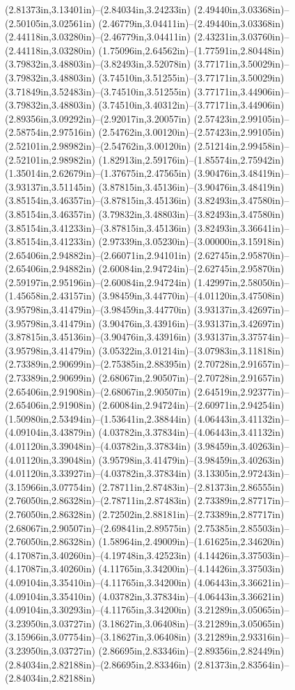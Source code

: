 (2.81373in,3.13401in)--(2.84034in,3.24233in) (2.49440in,3.03368in)--(2.50105in,3.02561in) (2.46779in,3.04411in)--(2.49440in,3.03368in) (2.44118in,3.03280in)--(2.46779in,3.04411in) (2.43231in,3.03760in)--(2.44118in,3.03280in) (1.75096in,2.64562in)--(1.77591in,2.80448in) (3.79832in,3.48803in)--(3.82493in,3.52078in) (3.77171in,3.50029in)--(3.79832in,3.48803in) (3.74510in,3.51255in)--(3.77171in,3.50029in) (3.71849in,3.52483in)--(3.74510in,3.51255in) (3.77171in,3.44906in)--(3.79832in,3.48803in) (3.74510in,3.40312in)--(3.77171in,3.44906in) (2.89356in,3.09292in)--(2.92017in,3.20057in) (2.57423in,2.99105in)--(2.58754in,2.97516in) (2.54762in,3.00120in)--(2.57423in,2.99105in) (2.52101in,2.98982in)--(2.54762in,3.00120in) (2.51214in,2.99458in)--(2.52101in,2.98982in) (1.82913in,2.59176in)--(1.85574in,2.75942in) (1.35014in,2.62679in)--(1.37675in,2.47565in) (3.90476in,3.48419in)--(3.93137in,3.51145in) (3.87815in,3.45136in)--(3.90476in,3.48419in) (3.85154in,3.46357in)--(3.87815in,3.45136in) (3.82493in,3.47580in)--(3.85154in,3.46357in) (3.79832in,3.48803in)--(3.82493in,3.47580in) (3.85154in,3.41233in)--(3.87815in,3.45136in) (3.82493in,3.36641in)--(3.85154in,3.41233in) (2.97339in,3.05230in)--(3.00000in,3.15918in) (2.65406in,2.94882in)--(2.66071in,2.94101in) (2.62745in,2.95870in)--(2.65406in,2.94882in) (2.60084in,2.94724in)--(2.62745in,2.95870in) (2.59197in,2.95196in)--(2.60084in,2.94724in) (1.42997in,2.58050in)--(1.45658in,2.43157in) (3.98459in,3.44770in)--(4.01120in,3.47508in) (3.95798in,3.41479in)--(3.98459in,3.44770in) (3.93137in,3.42697in)--(3.95798in,3.41479in) (3.90476in,3.43916in)--(3.93137in,3.42697in) (3.87815in,3.45136in)--(3.90476in,3.43916in) (3.93137in,3.37574in)--(3.95798in,3.41479in) (3.05322in,3.01214in)--(3.07983in,3.11818in) (2.73389in,2.90699in)--(2.75385in,2.88395in) (2.70728in,2.91657in)--(2.73389in,2.90699in) (2.68067in,2.90507in)--(2.70728in,2.91657in) (2.65406in,2.91908in)--(2.68067in,2.90507in) (2.64519in,2.92377in)--(2.65406in,2.91908in) (2.60084in,2.94724in)--(2.60971in,2.94254in) (1.50980in,2.53494in)--(1.53641in,2.38844in) (4.06443in,3.41132in)--(4.09104in,3.43879in) (4.03782in,3.37834in)--(4.06443in,3.41132in) (4.01120in,3.39048in)--(4.03782in,3.37834in) (3.98459in,3.40263in)--(4.01120in,3.39048in) (3.95798in,3.41479in)--(3.98459in,3.40263in) (4.01120in,3.33927in)--(4.03782in,3.37834in) (3.13305in,2.97243in)--(3.15966in,3.07754in) (2.78711in,2.87483in)--(2.81373in,2.86555in) (2.76050in,2.86328in)--(2.78711in,2.87483in) (2.73389in,2.87717in)--(2.76050in,2.86328in) (2.72502in,2.88181in)--(2.73389in,2.87717in) (2.68067in,2.90507in)--(2.69841in,2.89575in) (2.75385in,2.85503in)--(2.76050in,2.86328in) (1.58964in,2.49009in)--(1.61625in,2.34620in) (4.17087in,3.40260in)--(4.19748in,3.42523in) (4.14426in,3.37503in)--(4.17087in,3.40260in) (4.11765in,3.34200in)--(4.14426in,3.37503in) (4.09104in,3.35410in)--(4.11765in,3.34200in) (4.06443in,3.36621in)--(4.09104in,3.35410in) (4.03782in,3.37834in)--(4.06443in,3.36621in) (4.09104in,3.30293in)--(4.11765in,3.34200in) (3.21289in,3.05065in)--(3.23950in,3.03727in) (3.18627in,3.06408in)--(3.21289in,3.05065in) (3.15966in,3.07754in)--(3.18627in,3.06408in) (3.21289in,2.93316in)--(3.23950in,3.03727in) (2.86695in,2.83346in)--(2.89356in,2.82449in) (2.84034in,2.82188in)--(2.86695in,2.83346in) (2.81373in,2.83564in)--(2.84034in,2.82188in) 